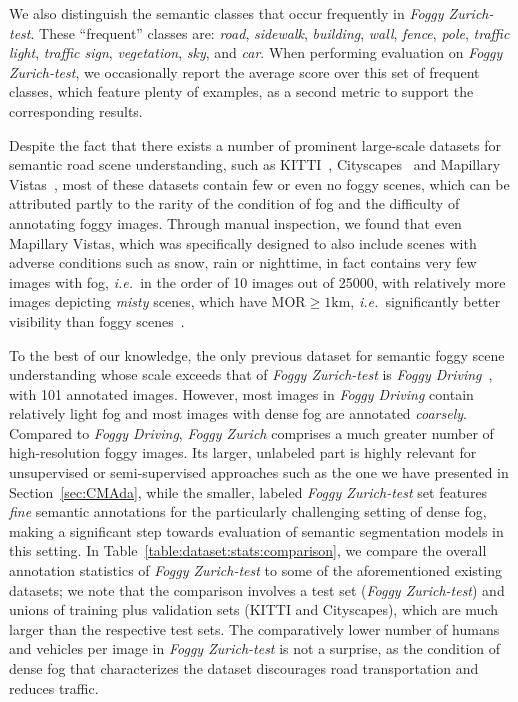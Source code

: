 \documentclass[twocolumn]{svjour3}          \smartqed  \usepackage{graphicx}
\newcommand{\ie}{\mbox{\emph{i.e.\ }}}
\begin{document}
We also distinguish the semantic classes that occur frequently in \emph{Foggy Zurich-test}. These ``frequent'' classes are: \emph{road}, \emph{sidewalk}, \emph{building}, \emph{wall}, \emph{fence}, \emph{pole}, \emph{traffic light}, \emph{traffic sign}, \emph{vegetation}, \emph{sky}, and \emph{car}. When performing evaluation on \emph{Foggy Zurich-test}, we occasionally report the average score over this set of frequent classes, which feature plenty of examples, as a second metric to support the corresponding results.

Despite the fact that there exists a number of prominent large-scale datasets for semantic road scene understanding, such as KITTI~\cite{kitti}, Cityscapes~\cite{Cityscapes} and Mapillary Vistas~\cite{Mapillary}, most of these datasets contain few or even no foggy scenes, which can be attributed partly to the rarity of the condition of fog and the difficulty of annotating foggy images. Through manual inspection, we found that even Mapillary Vistas, which was specifically designed to also include scenes with adverse conditions such as snow, rain or nighttime, in fact contains very few images with fog, \ie{}in the order of 10 images out of 25000, with relatively more images depicting \emph{misty} scenes, which have $\text{MOR} \geq 1 \text{km}$, \ie{}significantly better visibility than foggy scenes~\cite{Federal:meteorological:handbook}.

To the best of our knowledge, the only previous dataset for semantic foggy scene understanding whose scale exceeds that of \emph{Foggy Zurich-test} is \emph{Foggy Driving}~\cite{SFSU_synthetic}, with 101 annotated images. However, most images in \emph{Foggy Driving} contain relatively light fog and most images with dense fog are annotated \emph{coarsely}. Compared to \emph{Foggy Driving}, \emph{Foggy Zurich} comprises a much greater number of high-resolution foggy images. Its larger, unlabeled part is highly relevant for unsupervised or semi-supervised approaches such as the one we have presented in Section~\ref{sec:CMAda}, while the smaller, labeled \emph{Foggy Zurich-test} set features \emph{fine} semantic annotations for the particularly challenging setting of dense fog, making a significant step towards evaluation of semantic segmentation models in this setting. In Table~\ref{table:dataset:stats:comparison}, we compare the overall annotation statistics of \emph{Foggy Zurich-test} to some of the aforementioned existing datasets; we note that the comparison involves a test set (\emph{Foggy Zurich-test}) and unions of training plus validation sets (KITTI and Cityscapes), which are much larger than the respective test sets. The comparatively lower number of humans and vehicles per image in \emph{Foggy Zurich-test} is not a surprise, as the condition of dense fog that characterizes the dataset discourages road transportation and reduces traffic.
\end{document}
